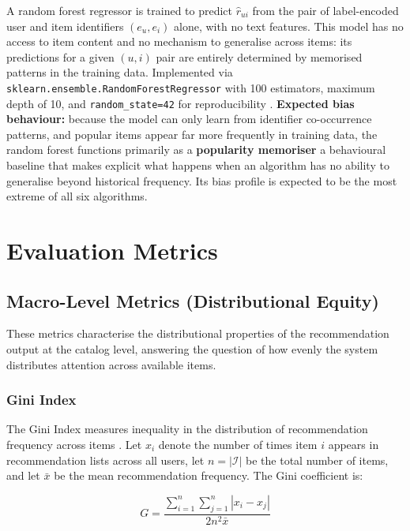 \documentclass[11pt,a4paper]{report}
\begin{document}
A random forest regressor \citep{breiman2001random} is trained to predict $\hat{r}_{ui}$ from the pair of label-encoded user and item identifiers $(e_u, e_i)$ alone, with no text features. This model has no access to item content and no mechanism to generalise across items: its predictions for a given $(u, i)$ pair are entirely determined by memorised patterns in the training data. Implemented via \texttt{sklearn.ensemble.RandomForestRegressor} with 100 estimators, maximum depth of 10, and \texttt{random\_state=42} for reproducibility \citep{pedregosa2011scikit}. \textbf{Expected bias behaviour:} because the model can only learn from identifier co-occurrence patterns, and popular items appear far more frequently in training data, the random forest functions primarily as a \textbf{popularity memoriser} a behavioural baseline that makes explicit what happens when an algorithm has no ability to generalise beyond historical frequency. Its bias profile is expected to be the most extreme of all six algorithms.

\section{Evaluation Metrics}
\label{sec:method_metrics}

\subsection{Macro-Level Metrics (Distributional Equity)}
\label{sec:method_metrics_macro}

These metrics characterise the distributional properties of the recommendation output at the catalog level, answering the question of how evenly the system distributes attention across available items.

\subsubsection*{Gini Index}

The Gini Index measures inequality in the distribution of recommendation frequency across items \citep{cowell2011measuring}. Let $x_i$ denote the number of times item $i$ appears in recommendation lists across all users, let $n = |\mathcal{I}|$ be the total number of items, and let $\bar{x}$ be the mean recommendation frequency. The Gini coefficient is:

\begin{equation}
G = \frac{\sum_{i=1}^{n}\sum_{j=1}^{n}|x_i - x_j|}{2n^2\bar{x}}
\end{equation}
\end{document}
